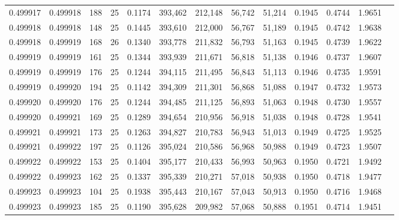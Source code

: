 \begin{tabular}{rrrrrrrrrrrrr}
0.499917 & 0.499918 & 188 &  25 &                                     0.1174 & 393,462 & 212,148 &  56,742 &  51,214 & 0.1945 & 0.4744 & 1.9651 \\
0.499918 & 0.499918 & 148 &  25 &                                     0.1445 & 393,610 & 212,000 &  56,767 &  51,189 & 0.1945 & 0.4742 & 1.9638 \\
0.499918 & 0.499919 & 168 &  26 &                                     0.1340 & 393,778 & 211,832 &  56,793 &  51,163 & 0.1945 & 0.4739 & 1.9622 \\
0.499919 & 0.499919 & 161 &  25 &                                     0.1344 & 393,939 & 211,671 &  56,818 &  51,138 & 0.1946 & 0.4737 & 1.9607 \\
0.499919 & 0.499919 & 176 &  25 &                                     0.1244 & 394,115 & 211,495 &  56,843 &  51,113 & 0.1946 & 0.4735 & 1.9591 \\
0.499919 & 0.499920 & 194 &  25 &                                     0.1142 & 394,309 & 211,301 &  56,868 &  51,088 & 0.1947 & 0.4732 & 1.9573 \\
0.499920 & 0.499920 & 176 &  25 &                                     0.1244 & 394,485 & 211,125 &  56,893 &  51,063 & 0.1948 & 0.4730 & 1.9557 \\
0.499920 & 0.499921 & 169 &  25 &                                     0.1289 & 394,654 & 210,956 &  56,918 &  51,038 & 0.1948 & 0.4728 & 1.9541 \\
0.499921 & 0.499921 & 173 &  25 &                                     0.1263 & 394,827 & 210,783 &  56,943 &  51,013 & 0.1949 & 0.4725 & 1.9525 \\
0.499921 & 0.499922 & 197 &  25 &                                     0.1126 & 395,024 & 210,586 &  56,968 &  50,988 & 0.1949 & 0.4723 & 1.9507 \\
0.499922 & 0.499922 & 153 &  25 &                                     0.1404 & 395,177 & 210,433 &  56,993 &  50,963 & 0.1950 & 0.4721 & 1.9492 \\
0.499922 & 0.499923 & 162 &  25 &                                     0.1337 & 395,339 & 210,271 &  57,018 &  50,938 & 0.1950 & 0.4718 & 1.9477 \\
0.499923 & 0.499923 & 104 &  25 &                                     0.1938 & 395,443 & 210,167 &  57,043 &  50,913 & 0.1950 & 0.4716 & 1.9468 \\
0.499923 & 0.499923 & 185 &  25 &                                     0.1190 & 395,628 & 209,982 &  57,068 &  50,888 & 0.1951 & 0.4714 & 1.9451 \\

\end{tabular}
